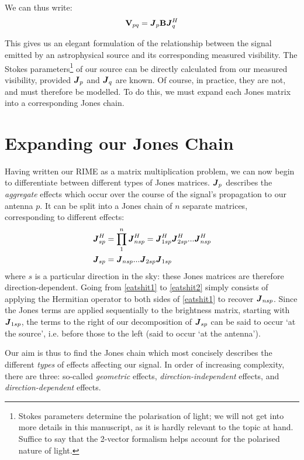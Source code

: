 \pg
We can thus write:
\begin{equation}
\textbf{V}_{pq} = \textbf{\emph{J}}_p \textbf{B} \textbf{\emph{J}}_q^H
\end{equation}

\pg
This gives us an elegant formulation of the relationship between the signal emitted by an astrophysical source and its corresponding measured visibility. The Stokes parameters\footnote{Stokes parameters determine the polarisation of light; we will not get into more details in this manuscript, as it is hardly relevant to the topic at hand. Suffice to say that the 2-vector formalism helps account for the polarised nature of light.} of our source can be directly calculated from our measured visibility, provided $\textbf{\emph{J}}_p$ and $\textbf{\emph{J}}_q$ are known. Of course, in practice, they are not, and must therefore be modelled. To do this, we must expand each Jones matrix into a corresponding Jones chain.

\section{Expanding our Jones Chain}
\label{section.RIME.JonesChain}
\pg
Having written our RIME as a matrix multiplication problem, we can now begin to differentiate between different types of Jones matrices. $\textbf{\emph{J}}_p$ describes the \emph{aggregate} effects which occur over the course of the signal's propagation to our antenna $p$. It can be split into a Jones chain of $n$ separate matrices, corresponding to different effects:
\begin{align}
\displaystyle \textbf{\emph{J}}_{sp}^H &= \prod_1^n \textbf{\emph{J}}_{nsp}^H = \textbf{\emph{J}}_{1sp}^H \textbf{\emph{J}}_{2sp}^H ... \textbf{\emph{J}}_{nsp}^H\label{eatshit1}\\
\displaystyle \textbf{\emph{J}}_{sp}   &= \textbf{\emph{J}}_{nsp}...\textbf{\emph{J}}_{2sp} \textbf{\emph{J}}_{1sp}\label{eatshit2}
\end{align}
where $s$ is a particular direction in the sky: these Jones matrices are therefore direction-dependent. Going from \cref{eatshit1} to \cref{eatshit2} simply consists of applying the Hermitian operator to both sides of \cref{eatshit1} to recover $\textbf{\emph{J}}_{nsp}$.
Since the Jones terms are applied sequentially to the brightness matrix, starting with $\textbf{\emph{J}}_{1sp}$, the terms to the right of our decomposition of $\textbf{\emph{J}}_{sp}$ can be said to occur `at the source', i.e. before those to the left (said to occur `at the antenna').

\pg
Our aim is thus to find the Jones chain which most concisely describes the different \emph{types} of effects affecting our signal. In order of increasing complexity, there are three: so-called \emph{geometric} effects, \emph{direction-independent} effects, and \emph{direction-dependent} effects.

